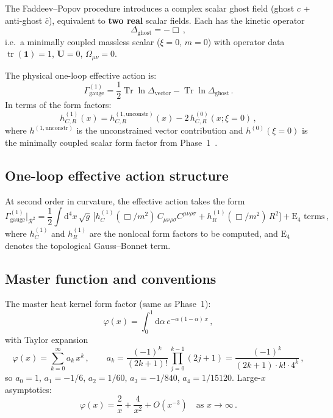 \documentclass[11pt,a4paper]{article}
\newcommand{\Id}{\mathbf{1}}
\newcommand{\Tr}{\operatorname{Tr}}
\newcommand{\tr}{\operatorname{tr}}
\newcommand{\Weylsq}{C_{\mu\nu\rho\sigma}C^{\mu\nu\rho\sigma}}
\newcommand{\dd}{\mathrm{d}}
\theoremstyle{definition}
\theoremstyle{remark}
\begin{document}
The Faddeev--Popov procedure introduces a complex scalar ghost field
(ghost $c$ + anti-ghost $\bar{c}$), equivalent to \textbf{two real}
scalar fields.  Each has the kinetic operator
\begin{equation}
  \Delta_{\mathrm{ghost}} = -\Box\,,
  \label{eq:ghost-operator}
\end{equation}
i.e.\ a minimally coupled massless scalar ($\xi = 0$, $m = 0$) with
operator data $\tr(\Id)=1$, $\mathbf{U}=0$, $\Omega_{\mu\nu}=0$.

The physical one-loop effective action is:
\begin{equation}
  \boxed{
  \Gamma^{(1)}_{\mathrm{gauge}}
  = \frac{1}{2}\Tr\ln\Delta_{\mathrm{vector}}
  - \Tr\ln\Delta_{\mathrm{ghost}}\,.
  }
  \label{eq:gauge-effective-action}
\end{equation}
In terms of the form factors:
\begin{equation}
  \boxed{
  h_{C,R}^{(1)}(x) = h_{C,R}^{(1,\mathrm{unconstr})}(x)
  - 2\,h_{C,R}^{(0)}(x;\xi=0)\,,
  }
  \label{eq:ghost-subtraction}
\end{equation}
where $h^{(1,\mathrm{unconstr})}$ is the unconstrained vector
contribution and $h^{(0)}(\xi=0)$ is the minimally coupled scalar
form factor from Phase~1~\cite{NT1b_scalar}.


\subsection{One-loop effective action structure}

At second order in curvature, the effective action takes the form
\begin{equation}
  \Gamma^{(1)}_{\mathrm{gauge}}\Big|_{\mathcal{R}^2}
  = \frac{1}{2}\int \dd^4 x\,\sqrt{g}\,\bigl[
    h_C^{(1)}(\Box/m^2)\,\Weylsq
    + h_R^{(1)}(\Box/m^2)\,R^2
  \bigr] + \text{E}_4\text{ terms}\,,
  \label{eq:eff-action-weyl}
\end{equation}
where $h_C^{(1)}$ and $h_R^{(1)}$ are the nonlocal form factors
to be computed, and $\text{E}_4$ denotes the topological Gauss--Bonnet
term.


\subsection{Master function and conventions}

The master heat kernel form factor (same as Phase~1):
\begin{equation}
  \varphi(x) = \int_0^1 \dd\alpha\,e^{-\alpha(1-\alpha)\,x}\,,
  \label{eq:phi-def}
\end{equation}
with Taylor expansion
\begin{equation}
  \varphi(x) = \sum_{k=0}^\infty a_k\,x^k\,,\qquad
  a_k = \frac{(-1)^k}{(2k+1)!}\,\prod_{j=0}^{k-1}(2j+1)
  = \frac{(-1)^k}{(2k+1)\cdot k!\cdot 4^k}\,,
  \label{eq:phi-taylor}
\end{equation}
so $a_0 = 1$, $a_1 = -1/6$, $a_2 = 1/60$, $a_3 = -1/840$, $a_4 = 1/15120$.
Large-$x$ asymptotics:
\begin{equation}
  \varphi(x) = \frac{2}{x} + \frac{4}{x^2} + O(x^{-3})
  \quad\text{as } x \to \infty\,.
  \label{eq:phi-asymp}
\end{equation}
\end{document}
